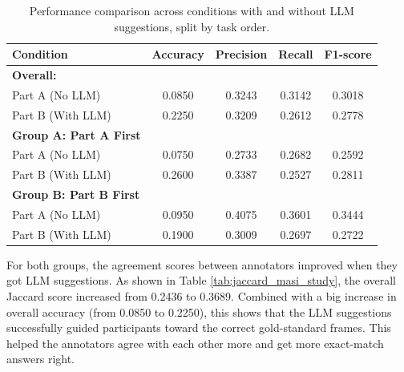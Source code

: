 \documentclass[
10pt, %
a4paper, %
oneside, %
headinclude,footinclude, %
] {book}%
\begin{document}
\begin{table}[htbp]
\centering
\begin{tabular}{lcccc}
\toprule
\textbf{Condition} & \textbf{Accuracy} & \textbf{Precision} & \textbf{Recall} & \textbf{F1-score} \\
\midrule

\textbf{Overall:} \\
Part A (No LLM)   & 0.0850 & 0.3243 & 0.3142 & 0.3018 \\
Part B (With LLM) & 0.2250 & 0.3209 & 0.2612 & 0.2778 \\
\midrule

\textbf{Group A: Part A First} \\
Part A (No LLM)   & 0.0750 & 0.2733 & 0.2682 & 0.2592 \\
Part B (With LLM) & 0.2600 & 0.3387 & 0.2527 & 0.2811 \\
\midrule

\textbf{Group B: Part B First} \\
Part A (No LLM)   & 0.0950 & 0.4075 & 0.3601 & 0.3444 \\
Part B (With LLM) & 0.1900 & 0.3009 & 0.2697 & 0.2722 \\
\bottomrule
\end{tabular}
\caption{Performance comparison across conditions with and without LLM suggestions, split by task order.}
\label{tab:performance_user_study}
\end{table}

For both groups, the agreement scores between annotators improved when they got LLM suggestions. As shown in Table \ref{tab:jaccard_masi_study}, the overall Jaccard score increased from 0.2436 to 0.3689. Combined with a big increase in overall accuracy (from 0.0850 to 0.2250), this shows that the LLM suggestions successfully guided participants toward the correct gold-standard frames. This helped the annotators agree with each other more and get more exact-match answers right.
\end{document}
